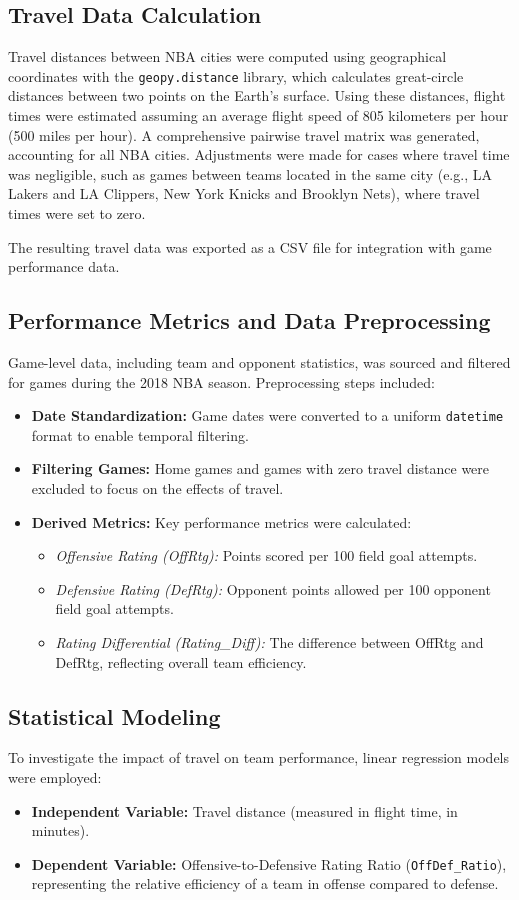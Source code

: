 \documentclass[12pt]{article}
\begin{document}
\subsection{Travel Data Calculation}
Travel distances between NBA cities were computed using geographical coordinates with the \texttt{geopy.distance} library, which calculates great-circle distances between two points on the Earth’s surface. Using these distances, flight times were estimated assuming an average flight speed of 805 kilometers per hour (500 miles per hour). A comprehensive pairwise travel matrix was generated, accounting for all NBA cities. Adjustments were made for cases where travel time was negligible, such as games between teams located in the same city (e.g., LA Lakers and LA Clippers, New York Knicks and Brooklyn Nets), where travel times were set to zero.

The resulting travel data was exported as a CSV file for integration with game performance data.

\subsection{Performance Metrics and Data Preprocessing}
Game-level data, including team and opponent statistics, was sourced and filtered for games during the 2018 NBA season. Preprocessing steps included:
\begin{itemize}
    \item \textbf{Date Standardization:} Game dates were converted to a uniform \texttt{datetime} format to enable temporal filtering.
    \item \textbf{Filtering Games:} Home games and games with zero travel distance were excluded to focus on the effects of travel.
    \item \textbf{Derived Metrics:} Key performance metrics were calculated:
    \begin{itemize}
        \item \textit{Offensive Rating (OffRtg):} Points scored per 100 field goal attempts.
        \item \textit{Defensive Rating (DefRtg):} Opponent points allowed per 100 opponent field goal attempts.
        \item \textit{Rating Differential (Rating\_Diff):} The difference between OffRtg and DefRtg, reflecting overall team efficiency.
    \end{itemize}
\end{itemize}

\subsection{Statistical Modeling}
To investigate the impact of travel on team performance, linear regression models were employed:
\begin{itemize}
    \item \textbf{Independent Variable:} Travel distance (measured in flight time, in minutes).
    \item \textbf{Dependent Variable:} Offensive-to-Defensive Rating Ratio (\texttt{OffDef\_Ratio}), representing the relative efficiency of a team in offense compared to defense.
\end{itemize}
\end{document}
